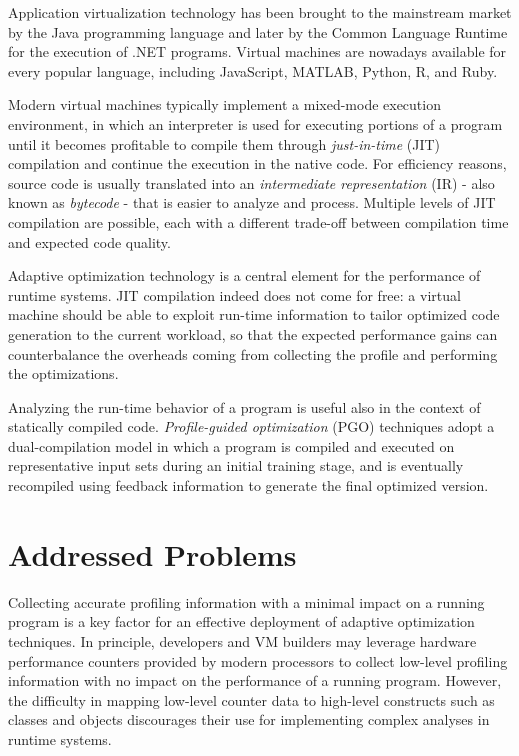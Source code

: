 Application virtualization technology has been brought to the mainstream market by the Java programming language and later by the Common Language Runtime for the execution of .NET programs. Virtual machines are nowadays available for every popular language, including JavaScript, MATLAB, Python, R, and Ruby.

Modern virtual machines typically implement a mixed-mode execution environment, in which an interpreter is used for executing portions of a program until it becomes profitable to compile them through {\em just-in-time} (JIT) compilation and continue the execution in the native code. For efficiency reasons, source code is usually translated into an {\em intermediate representation} (IR) - also known as {\em bytecode} - that is easier to analyze and process. Multiple levels of JIT compilation are possible, each with a different trade-off between compilation time and expected code quality.

Adaptive optimization technology is a central element for the performance of runtime systems. JIT compilation indeed does not come for free: a virtual machine should be able to exploit run-time information to tailor optimized code generation to the current workload, so that the expected performance gains can counterbalance the overheads coming from collecting the profile and performing the optimizations.

Analyzing the run-time behavior of a program is useful also in the context of statically compiled code. {\em Profile-guided optimization} (PGO) techniques adopt a dual-compilation model in which a program is compiled and executed on representative input sets during an initial training stage, and is eventually recompiled using feedback information to generate the final optimized version.

\section{Addressed Problems}

Collecting accurate profiling information with a minimal impact on a running program is a key factor for an effective deployment of adaptive optimization techniques. In principle, developers and VM builders may leverage hardware performance counters provided by modern processors to collect low-level profiling information with no impact on the performance of a running program. However, the difficulty in mapping low-level counter data to high-level constructs such as classes and objects discourages their use for implementing complex analyses in runtime systems.

